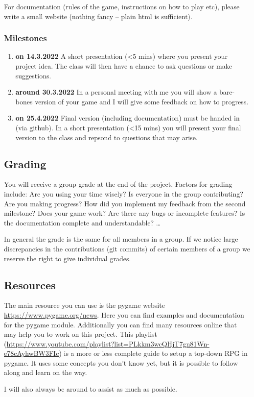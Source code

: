 \documentclass[11pt,a4paper]{report}
\begin{document}
For documentation (rules of the game, instructions on how to play etc), please write a small website (nothing fancy -- plain html is sufficient).

\subsubsection{Milestones}
\begin{enumerate}
\item {\bf on 14.3.2022} A short presentation (<5 mins) where you present your project idea. The class will then have a chance to ask questions or make suggestions.
\item {\bf around 30.3.2022} In a personal meeting with me you will show a bare-bones version of your game and I will give some feedback on how to progress.
\item {\bf on 25.4.2022} Final version (including documentation) must be handed in (via github). In a short presentation (<15 mins) you will present your final version to the class and repsond to questions that may arise.
\end{enumerate}
\subsection{Grading}
You will receive a group grade at the end of the project. Factors for grading include: Are you using your time wisely? Is everyone in the group contributing? Are you making progress? How did you implement my feedback from the second milestone? Does your game work? Are there any bugs or incomplete features? Is the documentation complete and understandable? \ldots

In general the grade is the same for all members in a group. If we notice large discrepancies in the contributions (git commits) of certain members of a group we reserve the right to give individual grades.

\subsection{Resources}
The main resource you can use is the pygame website
\url{https://www.pygame.org/news}. Here you can find examples and documentation
for the pygame module. Additionally you can find many resources online that may
help you to work on this project. This playlist
(\url{https://www.youtube.com/playlist?list=PLkkm3wcQHjT7gn81Wn-e78cAyhwBW3FIc})
is a more or less complete guide to setup a top-down RPG in pygame. It uses
some concepts you don't know yet, but it is possible to follow along and learn
on the way.

I will also always be around to assist as much as possible.
\end{document}
